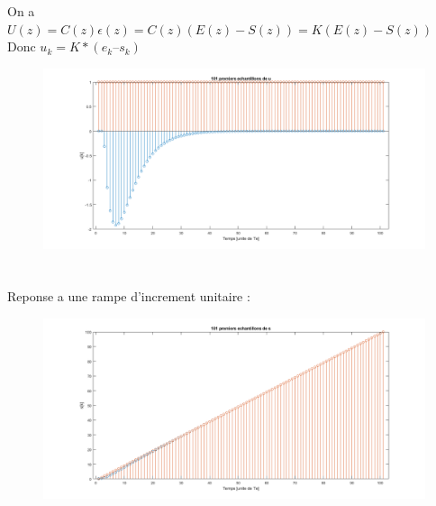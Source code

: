 \documentclass[14pt]{extarticle}
\begin{document}
\section{}
On a $U(z) = C(z)\epsilon(z) = C(z)(E(z)-S(z)) = K(E(z)-S(z))$
Donc $u_k = K * (e_k – s_k)$
\begin{figure}[tbh]
\vspace{0.1cm}
    \centering
    \includegraphics[width=\columnwidth]{tp2_10png.png}
    \footnotesize
    \vspace{\baselineskip}
\end{figure}

\section{}

Reponse a une rampe d'increment unitaire : 
\begin{figure}[tbh]
\vspace{0.1cm}
    \centering
    \includegraphics[width=\columnwidth]{tp2_11png.png}
    \footnotesize
    \vspace{\baselineskip}
\end{figure}

\section{}
\end{document}
